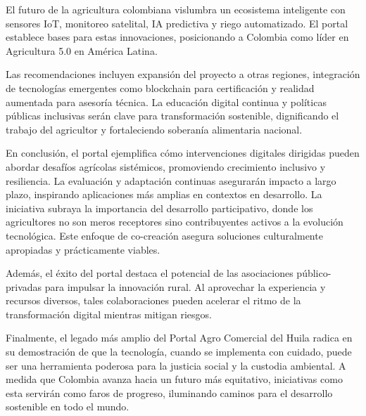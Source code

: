 El futuro de la agricultura colombiana vislumbra un ecosistema inteligente con sensores IoT, monitoreo satelital, IA predictiva y riego automatizado. El portal establece bases para estas innovaciones, posicionando a Colombia como líder en Agricultura 5.0 en América Latina.

Las recomendaciones incluyen expansión del proyecto a otras regiones, integración de tecnologías emergentes como blockchain para certificación y realidad aumentada para asesoría técnica. La educación digital continua y políticas públicas inclusivas serán clave para transformación sostenible, dignificando el trabajo del agricultor y fortaleciendo soberanía alimentaria nacional.

En conclusión, el portal ejemplifica cómo intervenciones digitales dirigidas pueden abordar desafíos agrícolas sistémicos, promoviendo crecimiento inclusivo y resiliencia. La evaluación y adaptación continuas asegurarán impacto a largo plazo, inspirando aplicaciones más amplias en contextos en desarrollo.
La iniciativa subraya la importancia del desarrollo participativo, donde los agricultores no son meros receptores sino contribuyentes activos a la evolución tecnológica. Este enfoque de co-creación asegura soluciones culturalmente apropiadas y prácticamente viables.

Además, el éxito del portal destaca el potencial de las asociaciones público-privadas para impulsar la innovación rural. Al aprovechar la experiencia y recursos diversos, tales colaboraciones pueden acelerar el ritmo de la transformación digital mientras mitigan riesgos.

Finalmente, el legado más amplio del Portal Agro Comercial del Huila radica en su demostración de que la tecnología, cuando se implementa con cuidado, puede ser una herramienta poderosa para la justicia social y la custodia ambiental. A medida que Colombia avanza hacia un futuro más equitativo, iniciativas como esta servirán como faros de progreso, iluminando caminos para el desarrollo sostenible en todo el mundo.